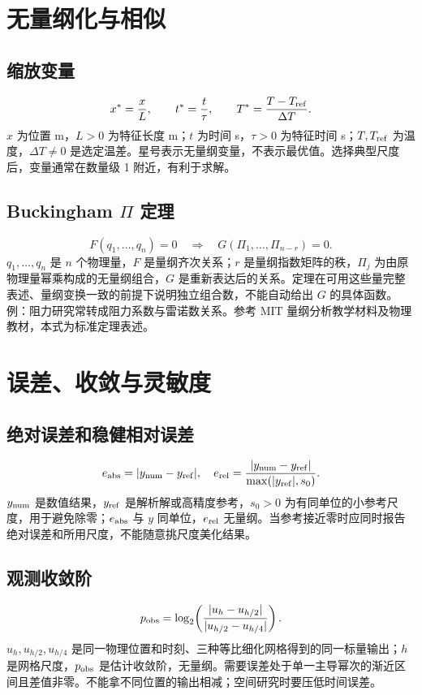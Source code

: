 \documentclass[UTF8,zihao=-4,openany,oneside,fontset=windows]{ctexbook}
\begin{document}
\section{无量纲化与相似}
\subsection{缩放变量}
\begin{equation}x^*=\frac{x}{L},\qquad t^*=\frac{t}{\tau},\qquad T^*=\frac{T-T_{\rm ref}}{\Delta T}.\end{equation}
$x$ 为位置 m，$L>0$ 为特征长度 m；$t$ 为时间 s，$\tau>0$ 为特征时间 s；$T,T_{\rm ref}$ 为温度，$\Delta T\ne0$ 是选定温差。星号表示无量纲变量，不表示最优值。选择典型尺度后，变量通常在数量级 1 附近，有利于求解。
\subsection{Buckingham $\Pi$ 定理}
\begin{equation}F(q_1,\ldots,q_n)=0\quad\Longrightarrow\quad G(\Pi_1,\ldots,\Pi_{n-r})=0.\end{equation}
$q_1,\ldots,q_n$ 是 $n$ 个物理量，$F$ 是量纲齐次关系；$r$ 是量纲指数矩阵的秩，$\Pi_j$ 为由原物理量幂乘构成的无量纲组合，$G$ 是重新表达后的关系。定理在可用这些量完整表述、量纲变换一致的前提下说明独立组合数，不能自动给出 $G$ 的具体函数。例：阻力研究常转成阻力系数与雷诺数关系。参考 MIT 量纲分析教学材料及物理教材，本式为标准定理表述。

\section{误差、收敛与灵敏度}
\subsection{绝对误差和稳健相对误差}
\begin{equation}e_{\rm abs}=|y_{\rm num}-y_{\rm ref}|,\quad e_{\rm rel}=\frac{|y_{\rm num}-y_{\rm ref}|}{\max(|y_{\rm ref}|,s_0)}.\end{equation}
$y_{\rm num}$ 是数值结果，$y_{\rm ref}$ 是解析解或高精度参考，$s_0>0$ 为有同单位的小参考尺度，用于避免除零；$e_{\rm abs}$ 与 $y$ 同单位，$e_{\rm rel}$ 无量纲。当参考接近零时应同时报告绝对误差和所用尺度，不能随意挑尺度美化结果。
\subsection{观测收敛阶}
\begin{equation}p_{\rm obs}=\log_2\!\left(\frac{|u_h-u_{h/2}|}{|u_{h/2}-u_{h/4}|}\right).\end{equation}
$u_h,u_{h/2},u_{h/4}$ 是同一物理位置和时刻、三种等比细化网格得到的同一标量输出；$h$ 是网格尺度，$p_{\rm obs}$ 是估计收敛阶，无量纲。需要误差处于单一主导幂次的渐近区间且差值非零。不能拿不同位置的输出相减；空间研究时要压低时间误差。
\end{document}
